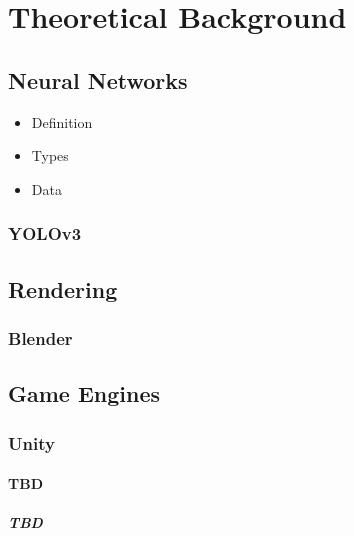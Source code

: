 \chapter{Theoretical Background}

\section{Neural Networks}
\begin{itemize}
\item Definition
\item Types
\item Data
\end{itemize}

\subsection{YOLOv3}

\section{Rendering}

\subsection{Blender}

\section{Game Engines}

\subsection{Unity}

\subsubsection{TBD}
 
\paragraph{TBD}